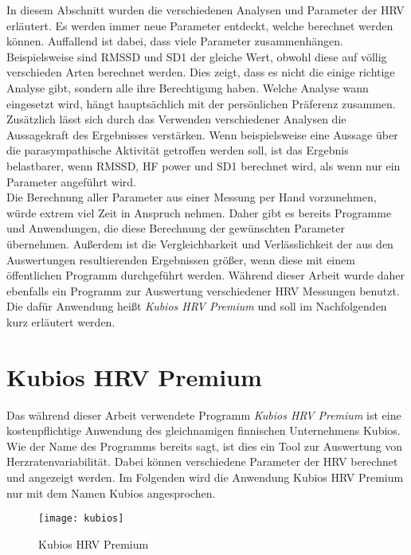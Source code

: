 In diesem Abschnitt wurden die verschiedenen Analysen und Parameter der HRV erläutert. Es werden immer neue Parameter entdeckt, welche berechnet werden können. Auffallend ist dabei, dass viele Parameter zusammenhängen. Beispielsweise sind RMSSD und SD1 der gleiche Wert, obwohl diese auf völlig verschieden Arten berechnet werden. Dies zeigt, dass es nicht die einige richtige Analyse gibt, sondern alle ihre Berechtigung haben. Welche Analyse wann eingesetzt wird, hängt hauptsächlich mit der persönlichen Präferenz zusammen.\\
Zusätzlich lässt sich durch das Verwenden verschiedener Analysen die Aussagekraft des Ergebnisses verstärken. Wenn beispielsweise eine Aussage über die parasympathische Aktivität getroffen werden soll, ist das Ergebnis belastbarer, wenn RMSSD, HF power und SD1 berechnet wird, als wenn nur ein Parameter angeführt wird. \\

Die Berechnung aller Parameter aus einer Messung per Hand vorzunehmen, würde extrem viel Zeit in Anspruch nehmen. Daher gibt es bereits Programme und Anwendungen, die diese Berechnung der gewünschten Parameter übernehmen. Außerdem ist die Vergleichbarkeit und Verlässlichkeit der aus den Auswertungen resultierenden Ergebnissen größer, wenn diese mit einem öffentlichen Programm durchgeführt werden. Während dieser Arbeit wurde daher ebenfalls ein Programm zur Auswertung verschiedener HRV Messungen benutzt. Die dafür  Anwendung heißt \textit{Kubios HRV Premium} und soll im Nachfolgenden kurz erläutert werden. 

\section{Kubios HRV Premium}
Das während dieser Arbeit verwendete Programm \textit{Kubios HRV Premium} ist eine kostenpflichtige Anwendung des gleichnamigen finnischen Unternehmens Kubios. Wie der Name des Programms bereits sagt, ist dies ein Tool zur Auswertung von Herzratenvariabilität. Dabei können verschiedene Parameter der HRV berechnet und angezeigt werden.
Im Folgenden wird die Anwendung Kubios HRV Premium nur mit dem Namen Kubios angesprochen. 
 \begin{figure}[H]
	\centering
	\texttt{[image: kubios]}
	\caption{Kubios HRV Premium}
	\label{fig:kubios}
\end{figure}

